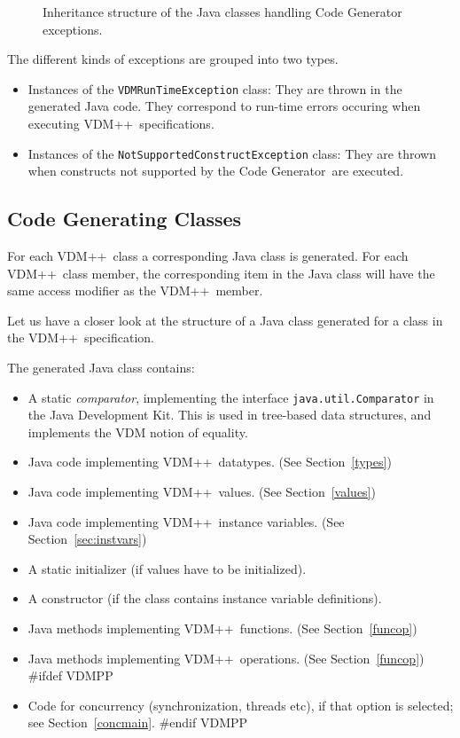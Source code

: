 \documentclass[\pformat,11pt]{article}
\newcommand{\tcg}{the Code Generator}
\newcommand{\VDM}{VDM++}
\begin{document}
\begin{itemize}
\begin{figure}[tbh]
\begin{center}
\begin{picture}
\end{picture}
\caption{Inheritance structure of the Java classes handling Code Generator exceptions.\label{fig:exceptionclasses}}
\end{center}
\end{figure}

The different kinds of exceptions are grouped into two types.
\begin{itemize}

\item Instances of the {\tt VDMRunTimeException} class: They are
thrown in the generated Java code. They correspond to run-time errors
occuring when executing \VDM\ specifications.  

\item Instances of the {\tt NotSupportedConstructException} class:
They are thrown when constructs not supported by \tcg\ are executed.  

\end{itemize}
\end{itemize}

\subsection{Code Generating Classes}
\label{sec:classes}

For each \VDM\ class a corresponding Java class is generated. For each
\VDM\ class member, the corresponding item in the  Java class will
have the same access modifier as the \VDM\ member.

Let us have a closer look at the structure of a Java class generated
for a class in the \VDM\ specification. 

The generated Java class contains:

\begin{itemize}
\item A static \textit{comparator}, implementing the interface
\texttt{java.util.Comparator} in the Java Development Kit. This is
used in tree-based data structures, and implements the VDM notion of
equality. 
\item Java code implementing \VDM\ datatypes. (See Section~\ref{types})
\item Java code implementing \VDM\ values. (See Section~\ref{values})
\item Java code implementing \VDM\ instance variables. (See Section~\ref{sec:instvars})
\item A static initializer (if values have to be initialized).
\item A constructor (if the class contains instance variable definitions).
\item Java methods implementing \VDM\ functions. (See Section~\ref{funcop})
\item Java methods implementing \VDM\ operations. (See
Section~\ref{funcop})
#ifdef VDMPP
\item Code for concurrency (synchronization, threads etc), if that
option is selected; see Section~\ref{concmain}.
#endif VDMPP
\end{itemize}
\end{document}
